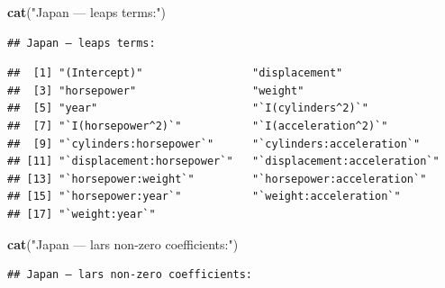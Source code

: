 \documentclass[
]{article}
\newenvironment{Shaded}{\begin{snugshade}}{\end{snugshade}}
\newcommand{\DecValTok}[1]{\textcolor[rgb]{0.00,0.00,0.81}{#1}}
\newcommand{\FunctionTok}[1]{\textcolor[rgb]{0.13,0.29,0.53}{\textbf{#1}}}
\newcommand{\NormalTok}[1]{#1}
\newcommand{\SpecialCharTok}[1]{\textcolor[rgb]{0.81,0.36,0.00}{\textbf{#1}}}
\newcommand{\StringTok}[1]{\textcolor[rgb]{0.31,0.60,0.02}{#1}}
\begin{document}
\begin{Shaded}
\begin{Highlighting}[]
\FunctionTok{cat}\NormalTok{(}\StringTok{"Japan — leaps terms:"}\NormalTok{)}
\end{Highlighting}
\end{Shaded}

\begin{verbatim}
## Japan — leaps terms:
\end{verbatim}

\begin{Shaded}
\end{Shaded}

\begin{verbatim}
##  [1] "(Intercept)"                 "displacement"               
##  [3] "horsepower"                  "weight"                     
##  [5] "year"                        "`I(cylinders^2)`"           
##  [7] "`I(horsepower^2)`"           "`I(acceleration^2)`"        
##  [9] "`cylinders:horsepower`"      "`cylinders:acceleration`"   
## [11] "`displacement:horsepower`"   "`displacement:acceleration`"
## [13] "`horsepower:weight`"         "`horsepower:acceleration`"  
## [15] "`horsepower:year`"           "`weight:acceleration`"      
## [17] "`weight:year`"
\end{verbatim}

\begin{Shaded}
\begin{Highlighting}[]
\FunctionTok{cat}\NormalTok{(}\StringTok{"Japan — lars non{-}zero coefficients:"}\NormalTok{)}
\end{Highlighting}
\end{Shaded}

\begin{verbatim}
## Japan — lars non-zero coefficients:
\end{verbatim}

\begin{Shaded}
\end{Shaded}
\end{document}
